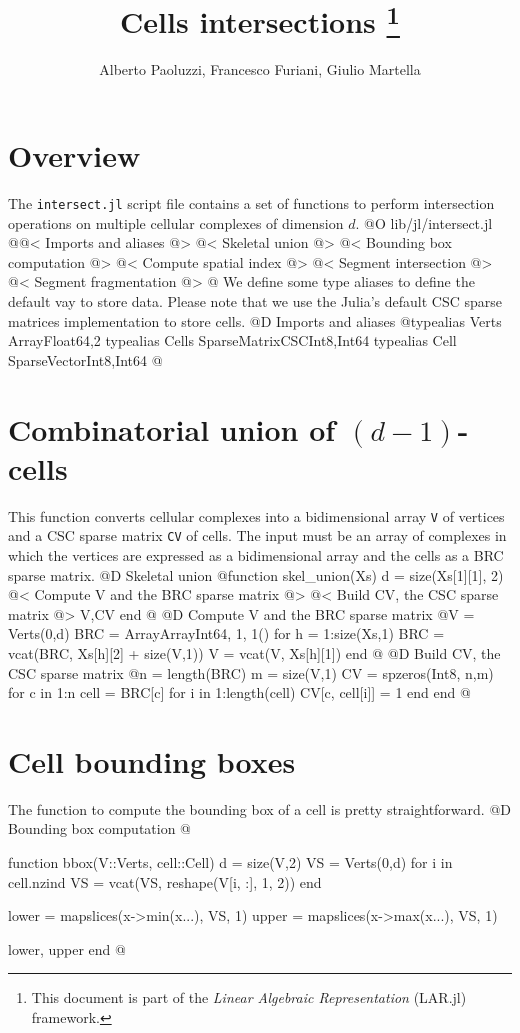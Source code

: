 \documentclass[10pt,oneside]{article}
\author{Alberto Paoluzzi, Francesco Furiani, Giulio Martella}
\title{Cells intersections
\footnote{This document is part of the \emph{Linear Algebraic Representation} (LAR.jl) framework.}
}
\begin{document}
\maketitle
\newpage

\section{Overview}
The \texttt{intersect.jl} script file contains a set of functions to perform intersection
operations on multiple cellular complexes of dimension $d$.
@O lib/jl/intersect.jl
@{@< Imports and aliases @>
@< Skeletal union @>
@< Bounding box computation @>
@< Compute spatial index @>
@< Segment intersection @>
@< Segment fragmentation @>
@}
We define some type aliases to define the default vay to store data.
Please note that we use the Julia's default CSC sparse matrices implementation
to store cells.
@D Imports and aliases
@{typealias Verts Array{Float64,2}
typealias Cells SparseMatrixCSC{Int8,Int64}
typealias Cell SparseVector{Int8,Int64}
@}

\section{Combinatorial union of $(d-1)$-cells}
This function converts cellular complexes into a bidimensional array \texttt{V} of 
vertices and a CSC sparse matrix \texttt{CV} of cells. The input must be an array of complexes
in which the vertices are expressed as a bidimensional array and the cells as a BRC
sparse matrix.
@D Skeletal union
@{function skel_union(Xs)
    d = size(Xs[1][1], 2)
    @< Compute V and the BRC sparse matrix @>
    @< Build CV, the CSC sparse matrix @>
    V,CV
end
@}
@D Compute V and the BRC sparse matrix
@{V = Verts(0,d)
BRC = Array{Array{Int64, 1}, 1}()
for h = 1:size(Xs,1)
    BRC = vcat(BRC, Xs[h][2] + size(V,1))
    V = vcat(V, Xs[h][1])
end
@}
@D Build CV, the CSC sparse matrix
@{n = length(BRC)
m = size(V,1)
CV = spzeros(Int8, n,m)
for c in 1:n
    cell = BRC[c]
    for i in 1:length(cell)
        CV[c, cell[i]] = 1
    end
end
@}


\section{Cell bounding boxes}
The function to compute the bounding box of a cell
is pretty straightforward.
@D Bounding box computation
@{function bbox(V::Verts, cell::Cell)
    d = size(V,2)
    VS = Verts(0,d)
    for i in cell.nzind
        VS = vcat(VS, reshape(V[i, :], 1, 2))
    end
    
    lower = mapslices(x->min(x...), VS, 1)
    upper = mapslices(x->max(x...), VS, 1)
    
    lower, upper
end
@}
\end{document}
